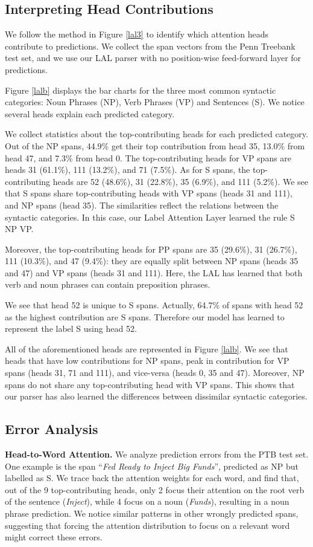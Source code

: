 \documentclass[11pt,a4paper]{article}
\begin{document}
\subsection{Interpreting Head Contributions}

We follow the method in Figure \ref{lal3} to identify which attention heads contribute to predictions. We collect the span vectors from the Penn Treebank test set, and we use our LAL parser with no position-wise feed-forward layer for predictions.

Figure \ref{lalb} displays the bar charts for the three most common syntactic categories: Noun Phrases (NP), Verb Phrases (VP) and Sentences (S). We notice several heads explain each predicted category.

We collect statistics about the top-contributing heads for each predicted category. Out of the NP spans, 44.9\% get their top contribution from head 35, 13.0\% from head 47, and 7.3\% from head 0. The top-contributing heads for VP spans are heads 31 (61.1\%), 111 (13.2\%), and 71 (7.5\%). As for S spans, the top-contributing heads are 52 (48.6\%), 31 (22.8\%), 35 (6.9\%), and 111 (5.2\%). We see that S spans share top-contributing heads with VP spans (heads 31 and 111), and NP spans (head 35). The similarities reflect the relations between the syntactic categories. In this case, our Label Attention Layer learned the rule S  NP VP.

Moreover, the top-contributing heads for PP spans are 35 (29.6\%), 31 (26.7\%), 111 (10.3\%), and 47 (9.4\%): they are equally split between NP spans (heads 35 and 47) and VP spans (heads 31 and 111). Here, the LAL has learned that both verb and noun phrases can contain preposition phrases.

We see that head 52 is unique to S spans. Actually, 64.7\% of spans with head 52 as the highest contribution are S spans. Therefore our model has learned to represent the label S using head 52.

All of the aforementioned heads are represented in Figure \ref{lalb}. We see that heads that have low contributions for NP spans, peak in contribution for VP spans (heads 31, 71 and 111), and vice-versa (heads 0, 35 and 47). Moreover, NP spans do not share any top-contributing head with VP spans. This shows that our parser has also learned the differences between dissimilar syntactic categories.

\subsection{Error Analysis}
{\bf Head-to-Word Attention. } We analyze prediction errors from the PTB test set. One example is the span ``\textit{Fed Ready to Inject Big Funds}'', predicted as NP but labelled as S. We trace back the attention weights for each word, and find that, out of the 9 top-contributing heads, only 2 focus their attention on the root verb of the sentence (\textit{Inject}), while 4 focus on a noun (\textit{Funds}), resulting in a noun phrase prediction. We notice similar patterns in other wrongly predicted spans, suggesting that forcing the attention distribution to focus on a relevant word might correct these errors.
\end{document}

